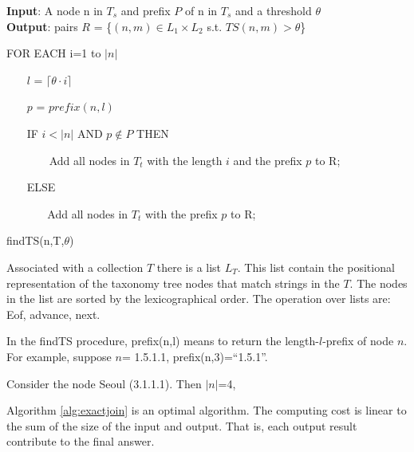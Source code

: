 \begin{algorithm}
{\bf Input}: A node n in $T_s$ and prefix $P$ of n in $T_s$ and a threshold $\theta$ \\
{\bf Output}:  pairs $R$ = \{$(n,m) \in L_1 \times L_2$ s.t. $TS(n,m) > \theta$\}
\begin{compactenum}[(1)]
\item FOR EACH i=1 to $|n|$
\item ~~~ $l$ = $\lceil \theta \cdot i \rceil$
\item ~~~ $p$ = $prefix(n,l)$
\item ~~~ IF $i < |n|$ AND $p \notin P$ THEN
\item ~~~~~~~ Add all nodes in $T_t$ with the length $i$ and the prefix $p$ to R;
\item ~~~ ELSE   
\item ~~~  ~~~  Add all nodes in $T_t$ with the prefix $p$ to R;
\end{compactenum}
\caption{findTS(n,T,$\theta$)}
\label{alg:treejoin}
\end{algorithm}


Associated with a collection $T$ there is a list $L_T$. This list contain the positional representation of the taxonomy tree nodes that match strings in the $T$. The nodes in the list are sorted by the lexicographical order. The operation over lists are: Eof, advance, next.

In the findTS procedure, prefix(n,l) means to return the length-$l$-prefix of node $n$. For example, suppose $n$= 1.5.1.1,  prefix(n,3)=``1.5.1''.  

\smallskip
\smallskip

\begin{example}
Consider the node Seoul  (3.1.1.1). Then $|n|$=4, 
\end{example}

\smallskip
\smallskip


\begin{theorem}  Algorithm \ref{alg:exactjoin} is an optimal algorithm. The computing cost is linear to the sum of the size of the input and output. That is, each output result contribute to the final answer.
\end{theorem}




